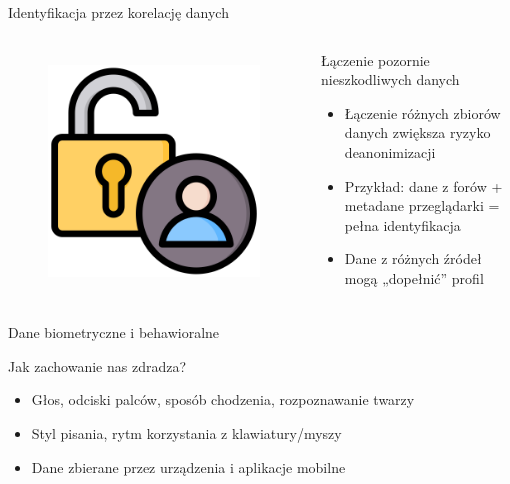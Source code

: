   
  \begin{frame}{Identyfikacja przez korelację danych}
  \begin{columns}[c]
      \begin{figure}
        \centering
        \includegraphics[height=0.45\textheight]{images/access-control.png}
        \label{fig:dataCorrelation}
      \end{figure}
      \begin{alertblock}{Łączenie pozornie nieszkodliwych danych}
        \begin{itemize}
          \item Łączenie różnych zbiorów danych zwiększa ryzyko deanonimizacji
          \item Przykład: dane z forów + metadane przeglądarki = pełna identyfikacja
          \item Dane z różnych źródeł mogą „dopełnić” profil
        \end{itemize}
      \end{alertblock}
  \end{columns}
  \end{frame}
  
  
  \begin{frame}{Dane biometryczne i behawioralne}
    \begin{alertblock}{Jak zachowanie nas zdradza?}
      \begin{itemize}
        \item Głos, odciski palców, sposób chodzenia, rozpoznawanie twarzy
        \item Styl pisania, rytm korzystania z klawiatury/myszy
        \item Dane zbierane przez urządzenia i aplikacje mobilne
      \end{itemize}
    \end{alertblock}
  \end{frame}
  
